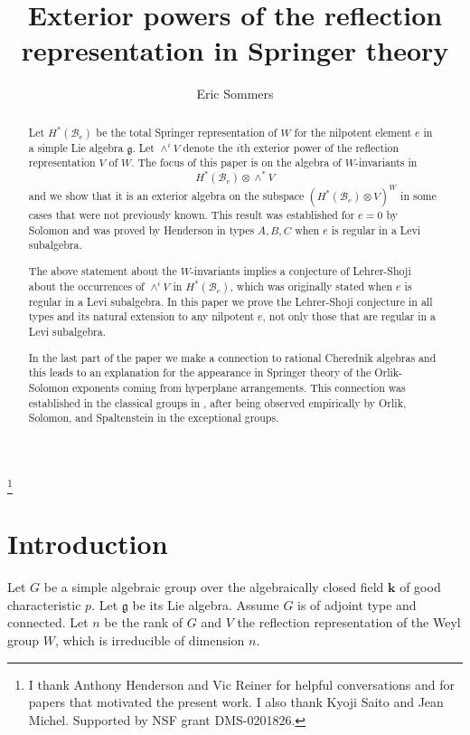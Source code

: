 \documentclass[10pt]{amsart}
\title[Exterior powers]{Exterior powers of the reflection representation in Springer theory}
\author{Eric Sommers}
\newcommand{\g}{\mathfrak{g}}
\newcommand{\flag}{{\mathcal B}}
\theoremstyle{plain}
\theoremstyle{definition}
\theoremstyle{remark}
\begin{document}
\begin{abstract}
Let $H^*(\flag_e)$ be the total Springer representation of $W$ for the nilpotent element $e$ in a simple Lie algebra $\g$.   
Let $\wedge^i V$ denote the $i$th exterior power of the reflection representation $V$ of $W$.
The focus of this paper is on the algebra of $W$-invariants in 
$$H^*(\flag_e) \otimes \wedge^*V$$ and we show that it is an exterior algebra on the subspace 
$(H^*(\flag_e) \otimes V)^W$ in some cases that were not previously known.
This result was established for $e=0$ by Solomon \cite{solomon} and was proved
by Henderson \cite{henderson:exterior} in types $A,B, C$  
when $e$ is regular in a Levi subalgebra.   

The above statement about the $W$-invariants implies a conjecture of Lehrer-Shoji \cite{lehrer-shoji:reflections} about the occurrences of $\wedge^i V$ in $H^*(\flag_e)$, which was originally stated when $e$ is regular in a Levi subalgebra.   
In this paper we prove the Lehrer-Shoji conjecture in all types and its natural extension to any nilpotent $e$, not only those that are regular in a Levi subalgebra.

In the last part of the paper we make a connection to rational Cherednik algebras and this leads to an explanation for the appearance in Springer theory of the Orlik-Solomon exponents coming from hyperplane arrangements.  This connection was established in the classical groups in \cite{lehrer-shoji:reflections}, \cite{spaltenstein:reflection} after being observed empirically by Orlik, Solomon, and Spaltenstein in the exceptional groups.
\end{abstract}

\thanks{I thank Anthony Henderson and Vic Reiner for helpful conversations and for papers that motivated the present work. 
I also thank Kyoji Saito and Jean Michel.  Supported by NSF grant DMS-0201826.}

\maketitle

\section{Introduction}


Let $G$ be a simple algebraic group over the algebraically closed field $\mathbf{k}$ of good characteristic $p$.  Let $\g$ be its Lie algebra.
Assume $G$ is of adjoint type and connected.
Let $n$ be the rank of $G$ and $V$ the reflection representation of the Weyl group $W$, which is irreducible of dimension $n$.
\end{document}
